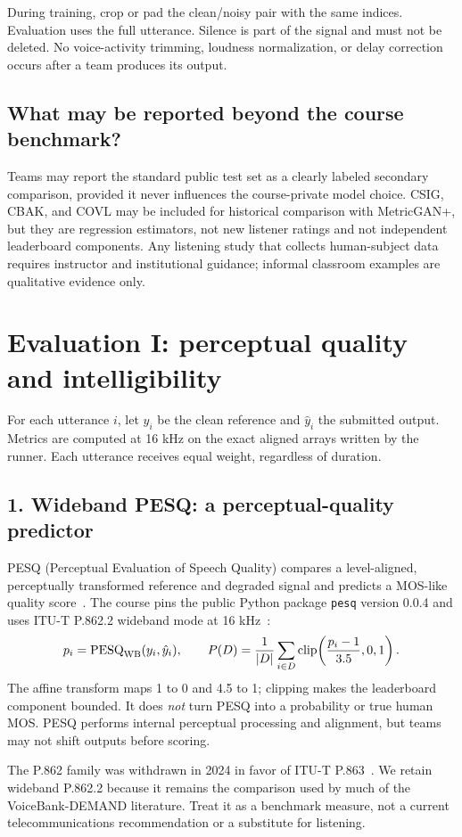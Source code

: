 \documentclass[11pt,letterpaper]{article}
\newcommand{\page}[1]{\clearpage\section{#1}}
\newcommand{\clip}{\operatorname{clip}}
\begin{document}
During training, crop or pad the clean/noisy pair with the same indices. Evaluation uses the full utterance. Silence is part of the signal and must not be deleted. No voice-activity trimming, loudness normalization, or delay correction occurs after a team produces its output.

\subsection{What may be reported beyond the course benchmark?}
Teams may report the standard public test set as a clearly labeled secondary comparison, provided it never influences the course-private model choice. CSIG, CBAK, and COVL may be included for historical comparison with MetricGAN+, but they are regression estimators, not new listener ratings and not independent leaderboard components. Any listening study that collects human-subject data requires instructor and institutional guidance; informal classroom examples are qualitative evidence only.

\page{Evaluation I: perceptual quality and intelligibility}
For each utterance $i$, let $y_i$ be the clean reference and $\hat y_i$ the submitted output. Metrics are computed at 16 kHz on the exact aligned arrays written by the runner. Each utterance receives equal weight, regardless of duration.

\subsection{1. Wideband PESQ: a perceptual-quality predictor}
PESQ (Perceptual Evaluation of Speech Quality) compares a level-aligned, perceptually transformed reference and degraded signal and predicts a MOS-like quality score~\cite{pesq}. The course pins the public Python package \texttt{pesq} version 0.0.4 and uses ITU-T P.862.2 wideband mode at 16 kHz~\cite{pesqcode}:
\begin{equation}
p_i=\operatorname{PESQ}_{\rm WB}(y_i,\hat y_i),\qquad
P(D)=\frac1{|D|}\sum_{i\in D}\clip\!\left(\frac{p_i-1}{3.5},0,1\right).
\end{equation}
The affine transform maps 1 to 0 and 4.5 to 1; clipping makes the leaderboard component bounded. It does \emph{not} turn PESQ into a probability or true human MOS. PESQ performs internal perceptual processing and alignment, but teams may not shift outputs before scoring.

The P.862 family was withdrawn in 2024 in favor of ITU-T P.863~\cite{itupesq}. We retain wideband P.862.2 because it remains the comparison used by much of the VoiceBank-DEMAND literature. Treat it as a benchmark measure, not a current telecommunications recommendation or a substitute for listening.
\end{document}
